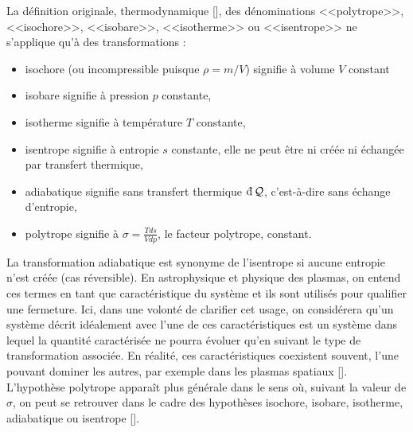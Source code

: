 La définition originale, thermodynamique [\cite{borel_thermodynamique_2005}], des dénominations <<polytrope>>, <<isochore>>, <<isobare>>, <<isotherme>> ou <<isentrope>> ne s’applique qu’à des transformations : 
\begin{itemize}
    \item isochore (ou incompressible puisque $\rho = m/V$) signifie à volume $V$ constant
    \item isobare signifie à pression $p$ constante,
    \item isotherme signifie à température $T$ constante, 
    \item isentrope signifie à entropie $s$ constante, elle ne peut être ni créée ni échangée par transfert thermique, 
    \item adiabatique signifie sans transfert thermique $\dj \mathcal{Q}$, c'est-à-dire sans échange d'entropie,
    \item polytrope signifie à $\sigma = \frac{Tds}{Vdp}$, le facteur polytrope, constant.
\end{itemize}
La transformation adiabatique est synonyme de l'isentrope si aucune entropie n'est créée (cas réversible).
En astrophysique et physique des plasmas, on entend ces termes en tant que caractéristique du système et ils sont utilisés pour qualifier une fermeture. Ici, dans une volonté de clarifier cet usage, on considérera qu’un système décrit idéalement avec l’une de ces caractéristiques est un système dans lequel la quantité caractérisée ne pourra évoluer qu’en suivant le type de transformation associée. En réalité, ces caractéristiques coexistent souvent, l'une pouvant dominer les autres, par exemple dans les plasmas spatiaux [\cite{livadiotis_non-equilibrium_2012}]. 
L'hypothèse polytrope apparaît plus générale dans le sens où, suivant la valeur de $\sigma$, on peut se retrouver dans le cadre des hypothèses isochore, isobare, isotherme, adiabatique ou isentrope [\cite{borel_thermodynamique_2005}].

